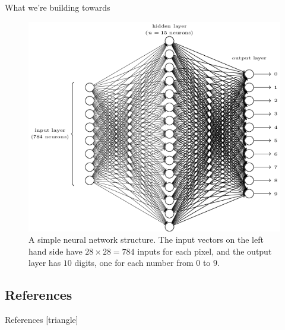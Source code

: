 \documentclass[xcolor=dvipsnames, fontsize=11pt, %
pagesize, %
parskip=half-, t]{beamer}
\begin{document}
\begin{frame}{What we're building towards}
\begin{figure}
\center
\includegraphics[scale=0.36]{goal.png}
\caption{A simple neural network structure. The input vectors on the left hand side have $28\times 28=784$ inputs for each pixel, and the output layer has $10$ digits, one for each number from $0$ to $9$.}
\end{figure}
\end{frame}



\subsection{References}
\begin{frame}[c]{References}
[triangle]

\href{http://www.slader.com/textbook/9780495011668-stewart-calculus-early-transcendentals-6th-edition/}{} \smallskip

\href{https://www.youtube.com/playlist?list=PLDesaqWTN6ESk16YRmzuJ8f6-rnuy0Ry7}{} \smallskip

\href{http://tutorial.math.lamar.edu/Classes/CalcIII/CalcIII.aspx}{} 
\end{frame}
\end{document}

